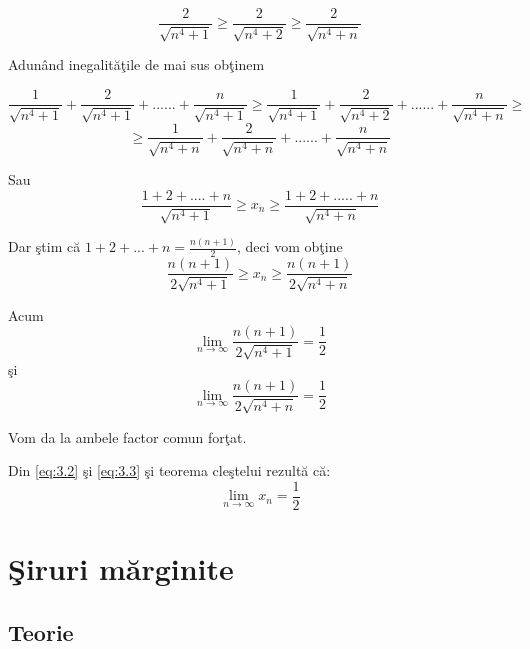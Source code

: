 \documentclass[a4paper,12pt,oneside]{report}
\begin{document}
\begin{enumerate}
\begin{displaymath}
  \frac{2}{\sqrt{n^{4}+1}}\geq \frac{2}{\sqrt{n^{4}+2}}\geq \frac{2}{\sqrt{n^{4}+n}}
\end{displaymath}


Adun\^ and inegalit\u a\c tile de mai sus ob\c tinem 

\begin{displaymath}
  \frac{1}{\sqrt{n^{4}+1}}+ \frac{2}{\sqrt{n^{4}+1}}+......+ \frac{n}{\sqrt{n^{4}+1}} \geq \frac{1}{\sqrt{n^{4}+1}}+ \frac{2}{\sqrt{n^{4}+2}}+......+ \frac{n}{\sqrt{n^{4}+n}}\geq
\end{displaymath}
\begin{displaymath}
  \geq\frac{1}{\sqrt{n^{4}+n}}+ \frac{2}{\sqrt{n^{4}+n}}+......+ \frac{n}{\sqrt{n^{4}+n}}
\end{displaymath}


Sau
\begin{displaymath}
  \frac{1+2+....+n}{\sqrt{n^{4}+1}}\geq x_{n}\geq \frac{1+2+.....+n}{\sqrt{n^{4}+n}}
\end{displaymath}


Dar \c stim c\u a \(1+2+...+n = \frac{n(n+1)}{2}\), deci vom ob\c tine 
\begin{displaymath}
  \frac{n(n+1)}{2\sqrt{n^{4}+1}}\geq x_{n}\geq \frac{n(n+1)}{2\sqrt{n^{4}+n}} \label{eq:3.2} \tag{3.2}
\end{displaymath}

Acum 
\begin{displaymath}
  \lim_{n \to \infty }\frac{n(n+1)}{2\sqrt{n^{4}+1}}=\frac{1}{2}  
\end{displaymath}
\c si 
\begin{displaymath}
    \lim_{n \to \infty }\frac{n(n+1)}{2\sqrt{n^{4}+n}}=\frac{1}{2} \label{eq:3.3} \tag{3.3}
\end{displaymath}

Vom da la ambele factor comun for\c tat. 

Din \ref{eq:3.2} \c si \ref{eq:3.3} \c si teorema cle\c stelui rezult\u a c\u a:
\begin{displaymath}
  \lim_{n \to \infty }x_{n}=\frac{1}{2}
\end{displaymath}
\end{enumerate}


\chapter{\c Siruri m\u arginite}

\section{Teorie}
\end{document}
